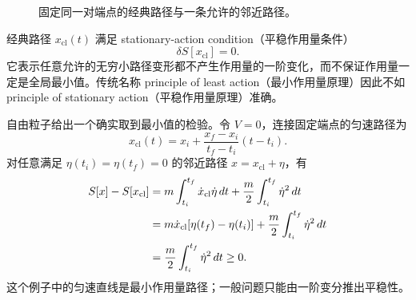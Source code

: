 \begin{figure}[htbp]
  \centering
  \caption{固定同一对端点的经典路径与一条允许的邻近路径。}
  \label{fig:QM-C02-S01-path-variation}
\end{figure}

经典路径 $x_{\mathrm{cl}}(t)$ 满足 stationary-action condition（平稳作用量条件）
\begin{equation}
  \boxed{\delta S[x_{\mathrm{cl}}]=0.}
  \label{eq:QM-C02-S01-stationary-action}
\end{equation}
它表示任意允许的无穷小路径变形都不产生作用量的一阶变化，而不保证作用量一定是全局最小值。传统名称 principle of least action（最小作用量原理）因此不如 principle of stationary action（平稳作用量原理）准确。

自由粒子给出一个确实取到最小值的检验。令 $V=0$，连接固定端点的匀速路径为
\[
  x_{\mathrm{cl}}(t)
  =x_i+\frac{x_f-x_i}{t_f-t_i}(t-t_i).
\]
对任意满足 $\eta(t_i)=\eta(t_f)=0$ 的邻近路径 $x=x_{\mathrm{cl}}+\eta$，有
\begin{align}
  S[x]-S[x_{\mathrm{cl}}]
  &=m\int_{t_i}^{t_f}\dot x_{\mathrm{cl}}\dot\eta\,dt
    +\frac m2\int_{t_i}^{t_f}\dot\eta^2\,dt \notag\\
  &=m\dot x_{\mathrm{cl}}[\eta(t_f)-\eta(t_i)]
    +\frac m2\int_{t_i}^{t_f}\dot\eta^2\,dt \notag\\
  &=\frac m2\int_{t_i}^{t_f}\dot\eta^2\,dt\geq0.
  \label{eq:QM-C02-S01-free-particle-minimum}
\end{align}
这个例子中的匀速直线是最小作用量路径；一般问题只能由一阶变分推出平稳性。


